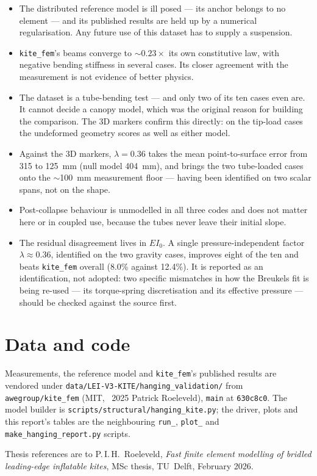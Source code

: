 \documentclass[11pt,a4paper]{article}
\begin{document}
\begin{itemize}
\item The distributed reference model is ill posed --- its anchor belongs to no
      element --- and its published results are held up by a numerical
      regularisation. Any future use of this dataset has to supply a suspension.
\item \texttt{kite\_fem}'s beams converge to $\sim0.23\times$ its own
      constitutive law, with negative bending stiffness in several cases. Its
      closer agreement with the measurement is not evidence of better physics.
\item The dataset is a tube-bending test --- and only two of its ten cases even
      are. It cannot decide a canopy model, which was the original reason for
      building the comparison. The 3D markers confirm this directly: on the
      tip-load cases the undeformed geometry scores as well as either model.
\item Against the 3D markers, $\lambda = 0.36$ takes the mean point-to-surface
      error from \SI{315}{} to \SI{125}{mm} (null model \SI{404}{mm}), and
      brings the two tube-loaded cases onto the $\sim$\SI{100}{mm} measurement
      floor --- having been identified on two scalar spans, not on the shape.
\item Post-collapse behaviour is unmodelled in all three codes and does not
      matter here or in coupled use, because the tubes never leave their initial
      slope.
\item The residual disagreement lives in $EI_0$. A single pressure-independent
      factor $\lambda \approx 0.36$, identified on the two gravity cases,
      improves eight of the ten and beats \texttt{kite\_fem} overall
      (8.0\% against 12.4\%). It is reported as an identification, not
      adopted: two specific mismatches in how the Breukels fit is being
      re-used --- its torque-spring discretisation and its effective
      pressure --- should be checked against the source first.
\end{itemize}

\section*{Data and code}

Measurements, the reference model and \texttt{kite\_fem}'s published results are
vendored under \texttt{data/LEI-V3-KITE/hanging\_validation/} from
\texttt{awegroup/kite\_fem} (MIT, \textcopyright~2025 Patrick Roeleveld),
\texttt{main} at \texttt{630c8c0}. The model builder is
\texttt{scripts/structural/hanging\_kite.py}; the driver, plots and this
report's tables are the neighbouring \texttt{run\_}, \texttt{plot\_} and
\texttt{make\_hanging\_report.py} scripts.

Thesis references are to P.\,I.\,H.~Roeleveld, \emph{Fast finite element
modelling of bridled leading-edge inflatable kites}, MSc thesis, TU~Delft,
February 2026.
\end{document}
